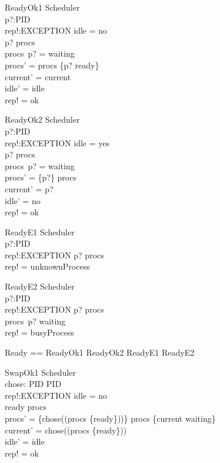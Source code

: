 \begin{schema}{ReadyOk1}
\Delta Scheduler \\
p?:PID \\
rep!:EXCEPTION
\where
idle = no \\
p? \in \dom procs \\
procs~p? = waiting \\
procs' = procs \oplus \{p? \mapsto ready\}\\
current' = current \\
idle' = idle \\
rep! = ok
\end{schema}

\begin{schema}{ReadyOk2}
\Delta Scheduler \\
p?:PID \\
rep!:EXCEPTION
\where
idle = yes \\
p? \in \dom procs \\
procs~p? = waiting \\
procs' = \{p?\} \ndres procs \\
current' = p? \\
idle' = no \\
rep! = ok
\end{schema}

\begin{schema}{ReadyE1}
\Xi Scheduler \\
p?:PID \\
rep!:EXCEPTION
\where
p? \notin \dom procs \\
rep! = unknownProcess
\end{schema}

\begin{schema}{ReadyE2}
\Xi Scheduler \\
p?:PID \\
rep!:EXCEPTION
\where
p? \in \dom procs \\
procs~p? \neq waiting \\
rep! = busyProcess
\end{schema}

\begin{zed}
Ready == ReadyOk1 \lor ReadyOk2 \lor ReadyE1 \lor ReadyE2
\end{zed}

\begin{schema}{SwapOk1}
\Delta Scheduler \\
chose: \power PID \fun PID \\
rep!:EXCEPTION
\where
idle = no \\
ready \in \ran procs \\
procs' = 
  \{chose(\dom(procs \rres \{ready\}))\} \ndres procs 
  \cup \{current \mapsto waiting\}\\
current' = chose(\dom(procs \rres \{ready\})) \\
idle' = idle \\
rep! = ok
\end{schema}

